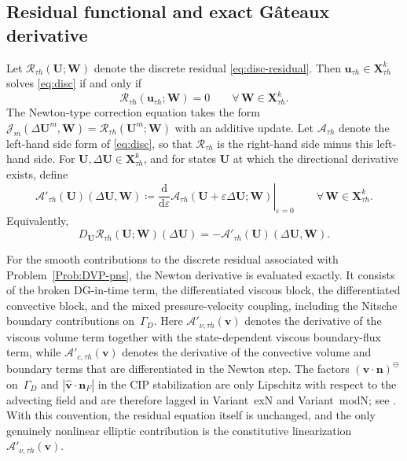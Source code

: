 \documentclass[DIV=16]{scrartcl}
\newcommand{\abs}[1]{\left\lvert #1\right\rvert}
\newcommand{\uu}{\boldsymbol v}
\newcommand{\nn}{\boldsymbol n}
\newcommand{\GhD}{\Gamma_{D}}
\newcommand{\negpart}{\ominus}
\newcommand{\yneg}[1]{\left(#1\right)^{\negpart}}
\newcommand{\eps}{\varepsilon}
\begin{document}
\subsection{Residual functional and exact G\^ateaux derivative}
\label{sec:newton:gateaux}

Let $\mathcal R_{\tau h}(\bm U;\bm W)$ denote the discrete residual
\eqref{eq:disc-residual}.
Then $\boldsymbol u_{\tau h}\in \boldsymbol X_{\tau h}^k$ solves \eqref{eq:disc} if and
only if
\begin{equation}\label{eq:newton-res}
  \mathcal R_{\tau h}(\boldsymbol u_{\tau h};\bm W)=0
  \qquad \forall\,\bm W\in \boldsymbol X_{\tau h}^k.
\end{equation}
The Newton-type correction equation takes the form
$\mathcal J_m(\Delta \bm U^m,\bm W)=\mathcal R_{\tau h}(\bm U^m;\bm W)$ with an
additive update.
Let $\mathcal A_{\tau h}$ denote the left-hand side form of \eqref{eq:disc}, so
that $\mathcal R_{\tau h}$ is the right-hand side minus this left-hand side.
For $\bm U,\Delta\bm U\in \boldsymbol X_{\tau h}^k$, and for states
$\bm U$ at which the directional derivative exists, define
\begin{equation}\label{eq:gateaux-def}
  \mathcal A'_{\tau h}(\bm U)(\Delta\bm U,\bm W)
  \coloneq
  \left.\frac{\mathrm d}{\mathrm d\eps}
  \mathcal A_{\tau h}(\bm U+\eps\Delta\bm U;\bm W)\right|_{\eps=0}
  \qquad \forall\,\bm W\in \boldsymbol X_{\tau h}^k.
\end{equation}
Equivalently,
\[
  D_{\bm U}\mathcal R_{\tau h}(\bm U;\bm W)(\Delta\bm U)
  =
  -\mathcal A'_{\tau h}(\bm U)(\Delta\bm U,\bm W).
\]

For the smooth contributions to the discrete residual associated with
Problem~\ref{Prob:DVP-pns}, the Newton derivative is evaluated exactly.
It consists of the broken DG-in-time term, the differentiated viscous block,
the differentiated convective block, and the mixed pressure-velocity coupling,
including the Nitsche boundary contributions on~$\GhD$.
Here $\mathcal A'_{\nu,\tau h}(\uu)$ denotes the derivative of the viscous
volume term together with the state-dependent viscous boundary-flux term, while
$\mathcal A'_{c,\tau h}(\uu)$ denotes the derivative of the convective
volume and boundary terms that are differentiated in the Newton step.
The factors $\yneg{\uu\cdot\nn}$ on~$\GhD$ and
$\abs{\hat{\uu}\cdot\nn_F}$ in the CIP stabilization are only
Lipschitz with respect to the advecting field and are therefore lagged in
Variant~exN and Variant~modN; see .
With this convention, the residual equation itself is unchanged, and the only
genuinely nonlinear elliptic contribution is the constitutive linearization
$\mathcal A'_{\nu,\tau h}(\uu)$.
\end{document}
